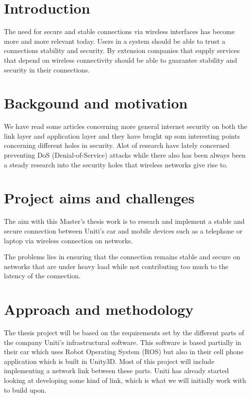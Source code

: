\documentclass[a4paper]{article}
\begin{document}
\section{Introduction}
The need for secure and stable connections via wireless interfaces has become
more and more relevant today.  Users in a system should be able to trust a
connections stability and security. By extension companies that supply services
that depend on wireless connectivity should be able to guarantee stability
and security in their connections.


\section{Backgound and motivation}

We have read some articles\cite{NIST_report} concerning more general
internet security on both the link layer and application layer and
they have broght up som interesting points concerning different holes
in security. Alot of research have lately concerned preventing 
DoS (Denial-of-Service) attacks while there also has been always been a
steady research into the security holes that wireless networks give rise to. 


\section{Project aims and challenges}

The aim with this Master's thesis work is to reseach and implement a stable and
secure connection between Uniti's car and mobile devices such as a telephone or
laptop via wireless connection on networks.

The problems lies in ensuring that the connection remains stable and secure on
networks that are under heavy load while not contributing too much to the
latency of the connection.

\section{Approach and methodology}
The thesis project will be based on the requirements set by the different parts
of the company Uniti's infrastructural software. This software is based
partially in their car which uses Robot Operating System (ROS) but also in
their cell phone application which is built in Unity3D. Most of this project
will include implementing a network link between these parts. Uniti has
already started looking at developing some kind of link, which is what
we will initially work with to build upon.
\end{document}
